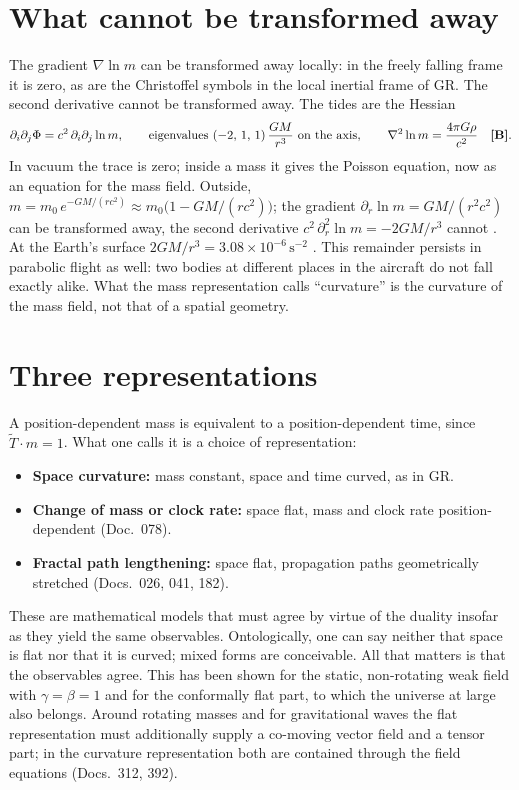 \section{What cannot be transformed away}

The gradient $\nabla\ln m$ can be transformed away locally: in the freely falling frame it is
zero, as are the Christoffel symbols in the local inertial frame of GR. The second derivative
cannot be transformed away. The tides are the Hessian
\begin{equation}
\partial_i\partial_j\Phi=c^2\,\partial_i\partial_j\ln m,\qquad
\text{eigenvalues }(-2,\,1,\,1)\,\frac{GM}{r^3}\ \text{on the axis},\qquad
\nabla^2\ln m=\frac{4\pi G\rho}{c^2}\quad\textbf{[B]}.
\end{equation}
In vacuum the trace is zero; inside a mass it gives the Poisson equation, now as an equation for
the mass field. Outside, $m=m_0\,e^{-GM/(rc^2)}\approx m_0\bigl(1-GM/(rc^2)\bigr)$; the gradient
$\partial_r\ln m=GM/(r^2c^2)$ can be transformed away, the second derivative
$c^2\,\partial_r^2\ln m=-2GM/r^3$ cannot \BM. At the Earth's surface $2GM/r^3=3.08\times10^{-6}\,\text{s}^{-2}$ \KM. This
remainder persists in parabolic flight as well: two bodies at different places in the aircraft do
not fall exactly alike. What the mass representation calls ``curvature'' is the curvature of the
mass field, not that of a spatial geometry.

\section{Three representations}

A position-dependent mass is equivalent to a position-dependent time, since
$\tilde T\cdot m=1$. What one calls it is a choice of representation:
\begin{itemize}[leftmargin=*,itemsep=1pt]
\item \textbf{Space curvature:} mass constant, space and time curved, as in GR.
\item \textbf{Change of mass or clock rate:} space flat, mass and clock rate position-dependent
(Doc.~078).
\item \textbf{Fractal path lengthening:} space flat, propagation paths geometrically stretched
(Docs.~026, 041, 182).
\end{itemize}
These are mathematical models that must agree by virtue of the duality insofar as they yield the
same observables. Ontologically, one can say neither that space is flat nor that it is curved; mixed
forms are conceivable. All that matters is that the observables agree. This has been shown for the
static, non-rotating weak field with $\gamma=\beta=1$ and for the conformally flat part, to which the
universe at large also belongs. Around rotating masses and for gravitational waves the flat
representation must additionally supply a co-moving vector field and a tensor part; in the
curvature representation both are contained through the field equations (Docs.~312, 392).

